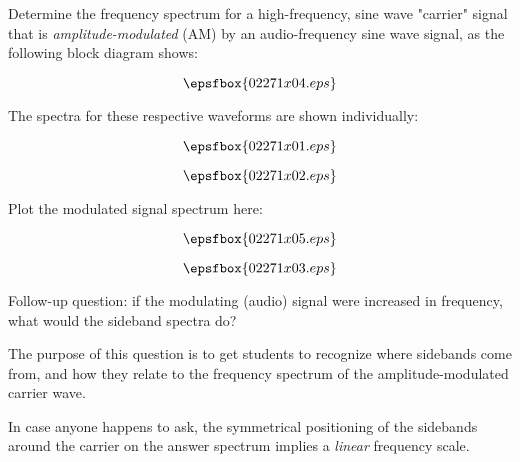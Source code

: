 

Determine the frequency spectrum for a high-frequency, sine wave "carrier" signal that is {\it amplitude-modulated} (AM) by an audio-frequency sine wave signal, as the following block diagram shows:

$$\epsfbox{02271x04.eps}$$

The spectra for these respective waveforms are shown individually:

$$\epsfbox{02271x01.eps}$$

$$\epsfbox{02271x02.eps}$$

Plot the modulated signal spectrum here:

$$\epsfbox{02271x05.eps}$$







$$\epsfbox{02271x03.eps}$$

\vskip 10pt

Follow-up question: if the modulating (audio) signal were increased in frequency, what would the sideband spectra do?







The purpose of this question is to get students to recognize where sidebands come from, and how they relate to the frequency spectrum of the amplitude-modulated carrier wave.

In case anyone happens to ask, the symmetrical positioning of the sidebands around the carrier on the answer spectrum implies a {\it linear} frequency scale.





